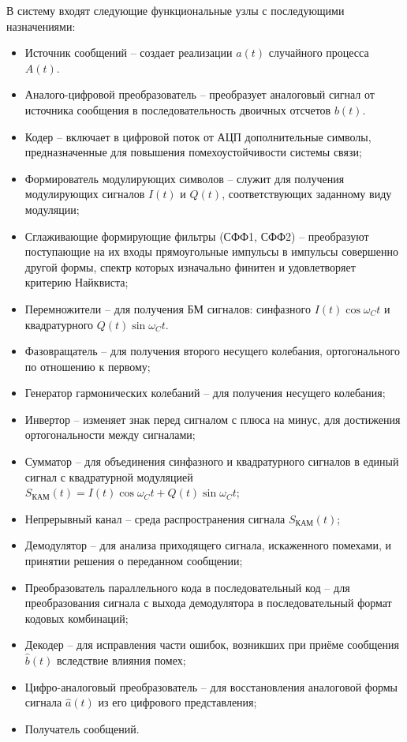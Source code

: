 \documentclass[a4paper, 12pt]{article}
\begin{document}
В систему входят следующие функциональные узлы с последующими назначениями:
\begin{itemize}
  \item Источник сообщений -- создает реализации $a(t)$ случайного
  процесса $A(t)$.
  \item Аналого-цифровой преобразователь -- преобразует аналоговый
  сигнал от источника сообщения в последовательность 
  двоичных отсчетов $b(t)$.
  \item Кодер -- включает в цифровой поток от АЦП дополнительные
  символы, предназначенные для повышения помехоустойчивости системы
  связи;
  \item Формирователь модулирующих символов -- служит для получения
  модулирующих сигналов $I(t)$ и $Q(t)$, соответствующих заданному
  виду модуляции;
  \item Сглаживающие формирующие фильтры (СФФ1, СФФ2) -- преобразуют 
  поступающие на их входы прямоугольные импульсы в импульсы 
  совершенно другой формы, спектр которых изначально финитен и 
  удовлетворяет критерию Найквиста;
  \item Перемножители -- для получения БМ сигналов: синфазного 
  $I(t)\cos{\omega_Ct}$ и квадратурного $Q(t)\sin{\omega_Ct}$.
  \item Фазовращатель -- для получения второго несущего колебания, 
  ортогонального по отношению к первому;
  \item Генератор гармонических колебаний -- для получения несущего  
  колебания;
  \item Инвертор -- изменяет знак перед сигналом с плюса на минус,
  для достижения ортогональности между сигналами;
  \item Сумматор -- для объединения синфазного и квадратурного 
  сигналов в единый сигнал с квадратурной модуляцией 
  $S_{КАМ}(t) = I(t)\cos{\omega_Ct} + Q(t)\sin{\omega_Ct}$;
  \item Непрерывный канал -- среда распространения сигнала 
  $S_{КАМ}(t)$;
  \item Демодулятор -- для анализа приходящего сигнала, 
  искаженного помехами, и принятии решения о переданном сообщении; 
  \item Преобразователь параллельного кода в последовательный код --
  для преобразования сигнала с выхода демодулятора в 
  последовательный формат кодовых комбинаций;
  \item Декодер -- для исправления части ошибок, возникших при приёме 
  сообщения $\hat{b}(t)$ вследствие влияния помех; 
  \item Цифро-аналоговый преобразователь -- для восстановления  
  аналоговой формы сигнала $\hat{a}(t)$ из его цифрового представления;
  \item Получатель сообщений.
\end{itemize}
\end{document}
